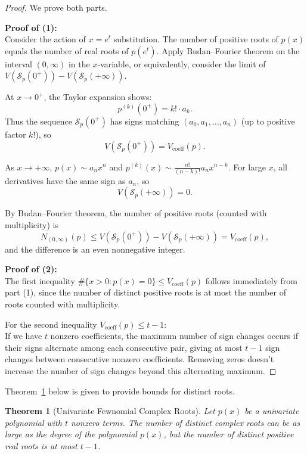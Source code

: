 \documentclass[11pt]{article}
\newtheorem{theorem}{Theorem}
\begin{document}
\begin{proof}
%
We prove both parts.

\noindent \textbf{Proof of (1):} \\
Consider the action of \( x = e^t \) substitution. The number of positive roots of \( p(x) \) equals the number of real roots of \( p(e^t) \). Apply Budan--Fourier theorem on the interval \( (0, \infty) \) in the \( x \)-variable, or equivalently, consider the limit of \( V(\mathcal{S}_p(0^+)) - V(\mathcal{S}_p(+\infty)) \).

At \( x \to 0^+ \), the Taylor expansion shows:
\[
p^{(k)}(0^+) = k! \cdot a_k.
\]
Thus the sequence \( \mathcal{S}_p(0^+) \) has signs matching \( (a_0, a_1, \dots, a_n) \) (up to positive factor \( k! \)), so
\[
V(\mathcal{S}_p(0^+)) = V_{\mathrm{coeff}}(p).
\]

As \( x \to +\infty \), \( p(x) \sim a_n x^n \) and \( p^{(k)}(x) \sim \frac{n!}{(n-k)!} a_n x^{n-k} \). For large \( x \), all derivatives have the same sign as \( a_n \), so
\[
V(\mathcal{S}_p(+\infty)) = 0.
\]

By Budan--Fourier theorem, the number of positive roots (counted with multiplicity) is
\[
N_{(0,\infty)}(p)\le V(\mathcal{S}_p(0^+)) - V(\mathcal{S}_p(+\infty)) = V_{\mathrm{coeff}}(p),
\]
and the difference is an even nonnegative integer.

\noindent \textbf{Proof of (2):} \\
The first inequality \( \#\{x>0 : p(x)=0\} \le V_{\mathrm{coeff}}(p) \) follows immediately from part (1), since the number of distinct positive roots is at most the number of roots counted with multiplicity.

For the second inequality \( V_{\mathrm{coeff}}(p) \le t-1 \): \\
If we have \( t \) nonzero coefficients, the maximum number of sign changes occurs if their signs alternate among each consecutive pair, giving at most \( t-1 \) sign changes between consecutive nonzero coefficients. Removing zeros doesn't increase the number of sign changes beyond this alternating maximum.
\end{proof}




Theorem~\ref{thm:khovanskii-univariate} below is given to provide bounds for distinct roots. 
%
\begin{theorem}[Univariate Fewnomial Complex Roots]\label{thm:khovanskii-univariate}
Let \( p(x) \) be a univariate polynomial with \( t \) nonzero terms. The number of distinct complex roots can be as large as the degree of the polynomial $p(x)$, but the number of distinct positive real roots is at most \( t - 1 \).
\end{theorem}
\end{document}
